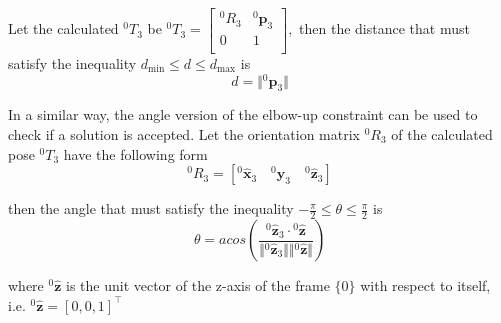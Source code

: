 Let the calculated ${}^0T_3$ be
$
{}^0T_3 = \begin{bmatrix}
{}^0R_3 & {}^0\mathbf{p}_3 \\
0       & 1 \\
\end{bmatrix},
$
then the distance that must satisfy the inequality $d_{\min} \leq d \leq d_{\max}$ is 
\begin{equation}
d = \Vert {}^0\mathbf{p}_3 \Vert
\end{equation}

In a similar way, the angle version of the elbow-up constraint can be used to check if a solution is accepted. Let the orientation matrix ${}^0R_3$ of the calculated pose ${}^0T_3$ have the following form
\begin{equation}
{}^0R_3 = [ {}^0\mathbf{\hat{x}}_3 \quad {}^0\mathbf{\hat{y}}_3 \quad {}^0\mathbf{\hat{z}}_3 ]
\end{equation}

then the angle that must satisfy the inequality $-\frac{\pi}{2} \leq θ \leq \frac{\pi}{2}$ is
\begin{equation}
θ = acos \left( \frac{ {}^0\mathbf{\hat{z}}_3 \cdot {}^0\mathbf{\hat{z}} }{ \Vert {}^0\mathbf{\hat{z}}_3 \Vert  \Vert {}^0\mathbf{\hat{z}} \Vert } \right)
\end{equation}

where ${}^0\mathbf{\hat{z}}$ is the unit vector of the z-axis of the frame $\lbrace 0 \rbrace$ with respect to itself, i.e. ${}^0\mathbf{\hat{z}} = [0, 0, 1]^\top$